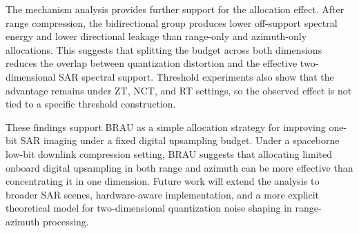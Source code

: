 \documentclass[conference]{IEEEtran}
\begin{document}
The mechanism analysis provides further support for the allocation effect. After range compression, the bidirectional group produces lower off-support spectral energy and lower directional leakage than range-only and azimuth-only allocations. This suggests that splitting the budget across both dimensions reduces the overlap between quantization distortion and the effective two-dimensional SAR spectral support. Threshold experiments also show that the advantage remains under ZT, NCT, and RT settings, so the observed effect is not tied to a specific threshold construction.

These findings support BRAU as a simple allocation strategy for improving one-bit SAR imaging under a fixed digital upsampling budget. Under a spaceborne low-bit downlink compression setting, BRAU suggests that allocating limited onboard digital upsampling in both range and azimuth can be more effective than concentrating it in one dimension. Future work will extend the analysis to broader SAR scenes, hardware-aware implementation, and a more explicit theoretical model for two-dimensional quantization noise shaping in range-azimuth processing.
\end{document}
